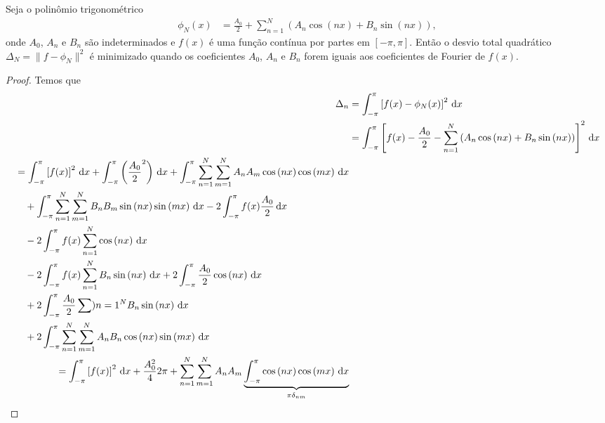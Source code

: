 \begin{teo} \label{teo:min_desvio_total_quad}
    Seja o polin\^{o}mio trigonom\'{e}trico
    \begin{align*}
        \phi_N(x) &= \frac{A_0}{2} + \sum_{n = 1}^N \left( A_n \cos\left( n x \right) + B_n \sin\left( n x \right) \right),
    \end{align*}
    onde $A_0$, $A_n$ e $B_n$ s\~{a}o indeterminados e $f(x)$ \'{e} uma fun\c{c}\~{a}o cont\'{i}nua por partes em $[-\pi, \pi]$. Ent\~{a}o o desvio total quadr\'{a}tico $\Delta_N = \| f - \phi_N \|^2$ \'{e} minimizado quando os coeficientes $A_0$, $A_n$ e $B_n$ forem iguais aos coeficientes de Fourier de $f(x)$.
\end{teo}
\begin{proof}
    Temos que
    \begin{align*}
        \Delta_n &= \int_{-\pi}^\pi \left[ f(x) - \phi_N(x) \right]^2 \id{x} \\
        &= \int_{-\pi}^\pi \left[ f(x) - \frac{A_0}{2} - \sum_{n = 1}^N \left( A_n \cos\left( n x \right) + B_n \sin\left( n x \right) \right) \right]^2 \id{x} \\
        \begin{split}
            &= \int_{-\pi}^\pi \left[ f(x) \right]^2 \id{x} + \int_{-\pi}^\pi \left( \frac{A_0}{2}^2 \right) \id{x} + \int_{-\pi}^\pi \sum_{n = 1}^N \sum_{m = 1}^N A_n A_m \cos\left( n x \right) \cos\left( m x \right) \id{x} \\
            &\quad {}+ \int_{-\pi}^\pi \sum_{n = 1}^N \sum_{m = 1}^N B_n B_m \sin\left( n x \right) \sin\left( m x \right) \id{x} - 2 \int_{-\pi}^\pi f(x) \frac{A_0}{2} \id{x} \\
            &\quad {}- 2 \int_{-\pi}^\pi f(x) \sum_{n = 1}^N \cos\left( n x \right) \id{x} \\
            &\quad {}- 2 \int_{-\pi}^\pi f(x) \sum_{n = 1}^N B_n \sin\left( n x \right) \id{x} + 2 \int_{-\pi}^\pi \frac{A_0}{2} \cos\left( n x \right) \id{x} \\
            &\quad {}+ 2 \int_{-\pi}^\pi \frac{A_0}{2} \sum){n = 1}^N B_n \sin\left( n x \right) \id{x} \\
            &\quad {}+ 2 \int_{-\pi}^\pi \sum_{n = 1}^N \sum_{m = 1}^N A_n B_n \cos\left( n x \right) \sin\left( m x \right) \id{x}
        \end{split} \\
        \begin{split}
            &= \int_{-\pi}^\pi \left[ f(x) \right]^2 \id{x} + \frac{A_0^2}{4} 2 \pi + \sum_{n = 1}^N \sum_{m = 1}^N A_n A_m \underbrace{\int_{-\pi}^\pi \cos\left( n x \right) \cos\left( m x \right) \id{x}}_{\pi \delta_{nm}} \\

\end{split}
\end{align*}
\end{proof}
